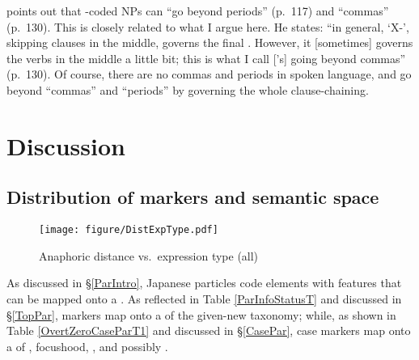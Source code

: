  points out that
-coded NPs can ``go beyond periods'' (p.~117) and ``commas'' (p.~130).
This is closely related to what I argue here.
%
%
He states:
``in general, `X-', skipping  clauses in the middle, governs the final .
However, it [sometimes] governs the verbs in the middle a little bit;
this is what I call ['s] going beyond commas'' (p.~130).
Of course, there are no commas and periods in spoken language,
 and  go beyond ``commas'' and ``periods'' by governing the whole clause-chaining.

\section{Discussion}\label{ParticlesDiscussion}

\subsection{Distribution of markers and semantic space}

\begin{figure}

	\texttt{[image: figure/DistExpType.pdf]}
	\caption{Anaphoric distance vs.\ expression type (all)}
	\label{DistExpTypeF2}

%
%
\end{figure}

As discussed in \S \ref{ParIntro},
Japanese particles code elements with features that can be mapped onto a .
As reflected in Table \ref{ParInfoStatusT} and discussed in \S \ref{TopPar},
 markers map onto a  of the given-new taxonomy;
while, as shown in Table \ref{OvertZeroCaseParT1} and discussed in \S \ref{CasePar},
case markers map onto a  of , focushood, , and possibly .

